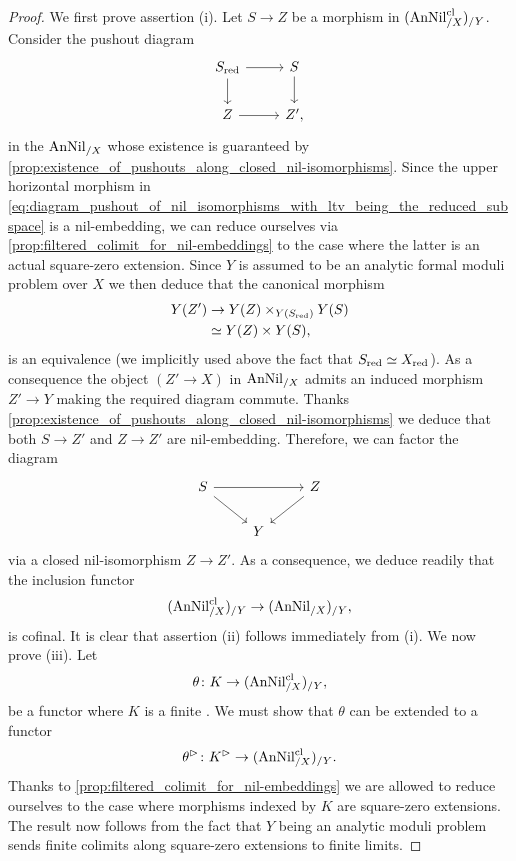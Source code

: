 \documentclass[10pt,a4paper,reqno]{amsart} %
\theoremstyle{plain}
\theoremstyle{definition}
\theoremstyle{remark}
\numberwithin{equation}{section}
\begin{document}
\begin{proof}
    We first prove assertion (i). Let $S \to Z$ be a morphism in $(\mathrm{AnNil}^{\mathrm{cl}}_{/X})_{/Y}$. Consider the pushout diagram
        \begin{equation} \label{eq:diagram_pushout_of_nil_isomorphisms_with_ltv_being_the_reduced_subspace}
        \begin{tikzcd}
            S_\red \ar{r} \ar{d} & S \ar{d} \\
            Z \ar{r} & Z',
        \end{tikzcd}
        \end{equation}
    in the \infcat $\mathrm{AnNil}_{/X}$ whose existence is guaranteed by \cref{prop:existence_of_pushouts_along_closed_nil-isomorphisms}. Since
    the upper horizontal morphism in \eqref{eq:diagram_pushout_of_nil_isomorphisms_with_ltv_being_the_reduced_subspace} is a nil-embedding, we can reduce
    ourselves via \cref{prop:filtered_colimit_for_nil-embeddings} to the case where the latter is an actual square-zero extension.
    Since $Y$ is assumed to be an analytic formal moduli problem over $X$ we then deduce that the canonical morphism
        \begin{align*}
            Y(Z') & \to Y(Z) \times_{Y(S_{\mathrm{red}})} Y(S) \\
            &\simeq Y(Z) \times Y(S),  
        \end{align*}
    is an equivalence (we implicitly used above the fact that $S_{\mathrm{red}} \simeq X_{\mathrm{red}}$). As a consequence the object $(Z' \to X)$ in $\mathrm{AnNil}_{/X}$ admits an induced morphism
    $Z' \to Y$ making the required diagram commute.
    Thanks \cref{prop:existence_of_pushouts_along_closed_nil-isomorphisms} we deduce that both
    $S \to Z'$ and $Z \to Z'$ are nil-embedding. Therefore, we can factor the diagram
        \[
        \begin{tikzcd}
            S \ar{rr} \ar{rd} & & Z \ar{dl} \\
                &               Y       &  
        \end{tikzcd}
        \]
    via a closed nil-isomorphism $Z \to Z'$. As a consequence, we deduce readily that the inclusion functor
        \[(\mathrm{AnNil}^{\mathrm{cl}}_{/X})_{/Y} \to (\mathrm{AnNil}_{/X})_{/Y},\]
    is cofinal.
    It is clear that assertion (ii) follows immediately from (i). We now prove (iii). Let 
        \[\theta \colon K \to (\mathrm{AnNil}^{\mathrm{cl}}_{/X})_{/Y},\]
    be a functor where
    $K$ is a finite \infcat. We must show that $\theta$ can be extended to a functor
        \[\theta^{\rhd} \colon K^{\rhd} \to (\mathrm{AnNil}^{\mathrm{cl}}_{/X})_{/Y}.\]
    Thanks to \cref{prop:filtered_colimit_for_nil-embeddings} we are allowed to reduce ourselves to the case where morphisms indexed by $K$
    are square-zero extensions. The result now follows from the fact that $Y$ being an analytic moduli problem sends finite colimits along square-zero extensions
    to finite limits.
\end{proof}
\end{document}
